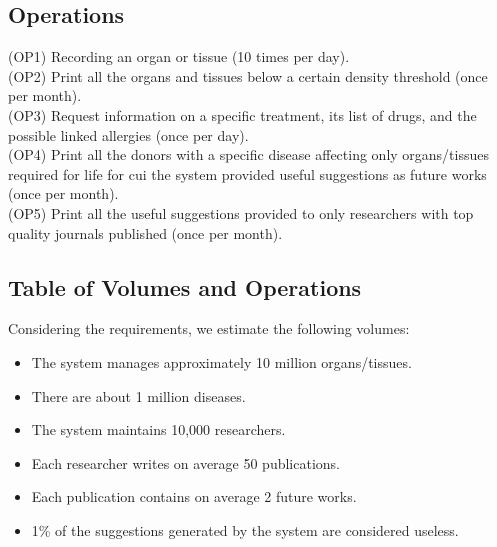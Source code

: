 \documentclass[11pt,a4paper]{article}
\begin{document}
\subsection{Operations}
(OP1) Recording an organ or tissue (10 times per day). \\
(OP2) Print all the organs and tissues below a certain density threshold (once per month). \\
(OP3) Request information on a specific treatment, its list of drugs, and the possible linked allergies (once per day). \\
(OP4) Print all the donors with a specific disease affecting only organs/tissues required for life for cui the system provided useful suggestions as future works (once per month). \\
(OP5) Print all the useful suggestions provided to only researchers with top quality journals published (once per month). \\

\subsection{Table of Volumes and Operations}

Considering the requirements, we estimate the following volumes:  
\begin{itemize}
    \item The system manages approximately 10 million organs/tissues.  
    \item There are about 1 million diseases.  
    \item The system maintains 10,000 researchers.  
    \item Each researcher writes on average 50 publications.  
    \item Each publication contains on average 2 future works.  
    \item 1\% of the suggestions generated by the system are considered useless.  
\end{itemize}
\end{document}
